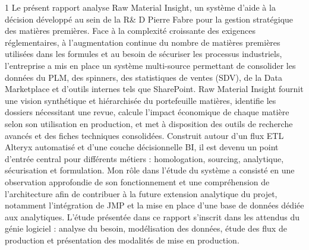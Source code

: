 \begin{titlepage}

\vspace{0.75cm}
\begin{spacing}{1}
Le présent rapport analyse Raw Material Insight, un système d’aide à la décision développé au sein de la R\& D Pierre Fabre pour la gestion stratégique des matières premières. Face à la complexité croissante des exigences réglementaires, à l’augmentation continue du nombre de matières premières utilisées dans les formules et au besoin de sécuriser les processus industriels, l’entreprise a mis en place un système multi-source permettant de consolider les données du PLM, des spinners, des statistiques de ventes (SDV), de la Data Marketplace et d’outils internes tels que SharePoint.
Raw Material Insight fournit une vision synthétique et hiérarchisée du portefeuille matières, identifie les dossiers nécessitant une revue, calcule l’impact économique de chaque matière selon son utilisation en production, et met à disposition des outils de recherche avancés et des fiches techniques consolidées. Construit autour d’un flux ETL Alteryx automatisé et d’une couche décisionnelle BI, il est devenu un point d’entrée central pour différents métiers : homologation, sourcing, analytique, sécurisation et formulation.
Mon rôle dans l’étude du système a consisté en une observation approfondie de son fonctionnement et une compréhension de l’architecture afin de contribuer à la future extension analytique du projet, notamment l’intégration de JMP et la mise en place d’une base de données dédiée aux analytiques.
L’étude présentée dans ce rapport s’inscrit dans les attendus du génie logiciel : analyse du besoin, modélisation des données, étude des flux de production et présentation des modalités de mise en production.


\vspace{0.5em}
\end{spacing}

\vspace{2em}




\end{titlepage}
